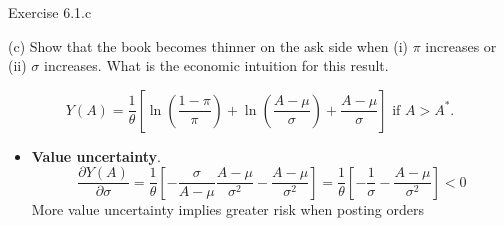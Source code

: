 \documentclass[english,10pt,aspectratio=169]{beamer}
\begin{document}
\begin{frame}{Exercise 6.1.c}
	\begin{exampleblock}{}
		(c) Show that the book becomes thinner on the ask side when (i) $\pi$ increases or (ii) $\sigma$ increases. What is the economic intuition for this result.
	\end{exampleblock}

	$$
		Y(A)=\frac{1}{\theta} \left[\ln \left(\frac{1-\pi}{\pi}\right) + \ln \left(\frac{A-\mu}{\sigma}\right) + \frac{A-\mu}{\sigma}\right]\text{ if } A>A^*.
	$$
	
	\begin{itemize}
		\item \textbf{Value uncertainty}. 
		\[
		\frac{\partial Y(A)}{\partial \sigma} = \frac{1}{\theta} \left[ -\frac{\sigma}{A-\mu}\frac{A-\mu}{\sigma^2} - \frac{A-\mu}{\sigma^2}\right]=\frac{1}{\theta} \left[ -\frac{1}{\sigma} - \frac{A-\mu}{\sigma^2}\right]<0
		\]
		More value uncertainty implies greater risk when posting orders
	\end{itemize}
\end{frame}
\end{document}
